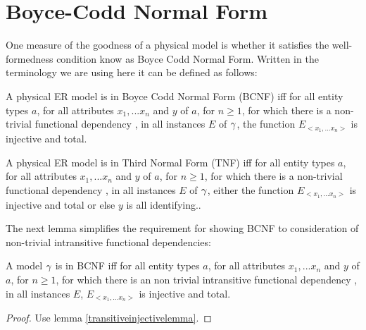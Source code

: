\section{Boyce-Codd Normal Form}
\noindent One measure of the goodness of a physical model is whether it satisfies the well-formedness condition know as Boyce Codd Normal Form.
Written in the terminology we are using here it can be defined as follows:
\begin{definition} %
A physical ER model is in Boyce Codd Normal Form (BCNF)  iff
for all entity types $a$, for all attributes $x_1,...x_n$ and $y$ of $a$, for $n \geq 1$, 
for which  there is a non-trivial functional dependency , 
in all instances $E$  of $\gamma$, the function $E_{<x_1,...x_n>}$ is injective and total.  
\end{definition}

\begin{definition} %
A physical ER model is in Third Normal Form (TNF)  iff
for all entity types $a$, for all attributes $x_1,...x_n$ and $y$ of $a$, for $n \geq 1$, 
for which  there is a non-trivial functional dependency , 
in all instances $E$  of $\gamma$, either the function $E_{<x_1,...x_n>}$ is injective and total
or else $y$ is all identifying..  
\end{definition}

\noindent The next lemma simplifies the requirement for showing BCNF to consideration of non-trivial
intransitive functional dependencies:
\begin{lemma}
\label{BCNFsublemma}
A model $\gamma$ is in BCNF iff
for all entity types $a$, for all attributes $x_1,...x_n$ and $y$ of $a$, for $n \geq 1$, 
for which there is an non trivial intransitive functional dependency ,
in all instances $E$, $E_{<x_1,...x_n>}$ is injective and total. 
\end{lemma}
\begin{proof}Use lemma \ref{transitiveinjectivelemma}.
\end{proof}

